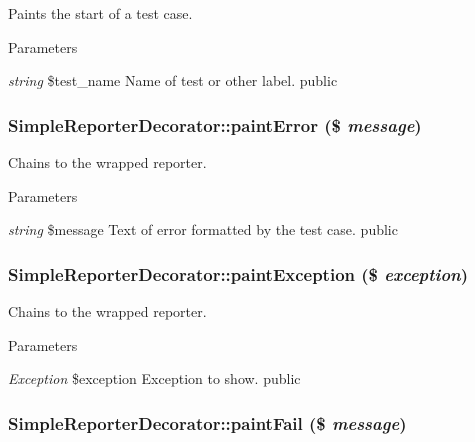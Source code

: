 \label{class_simple_reporter_decorator_aa6a8e6c378555a2b30339a3846c98144}
Paints the start of a test case. 
\begin{DoxyParams}{Parameters}
\item[{\em string}]\$test\_\-name Name of test or other label.  public \end{DoxyParams}
\hypertarget{class_simple_reporter_decorator_ab13238fe02b14c8c115d74c83d69775f}{
\subsubsection[{paintError}]{\setlength{\rightskip}{0pt plus 5cm}SimpleReporterDecorator::paintError (\$ {\em message})}}
\label{class_simple_reporter_decorator_ab13238fe02b14c8c115d74c83d69775f}
Chains to the wrapped reporter. 
\begin{DoxyParams}{Parameters}
\item[{\em string}]\$message Text of error formatted by the test case.  public \end{DoxyParams}
\hypertarget{class_simple_reporter_decorator_ae7062bed7d3fbfdce2f75850d6e86674}{
\subsubsection[{paintException}]{\setlength{\rightskip}{0pt plus 5cm}SimpleReporterDecorator::paintException (\$ {\em exception})}}
\label{class_simple_reporter_decorator_ae7062bed7d3fbfdce2f75850d6e86674}
Chains to the wrapped reporter. 
\begin{DoxyParams}{Parameters}
\item[{\em Exception}]\$exception Exception to show.  public \end{DoxyParams}
\hypertarget{class_simple_reporter_decorator_a4dd462fa2d69921c1c4994e31df3be21}{
\subsubsection[{paintFail}]{\setlength{\rightskip}{0pt plus 5cm}SimpleReporterDecorator::paintFail (\$ {\em message})}}

